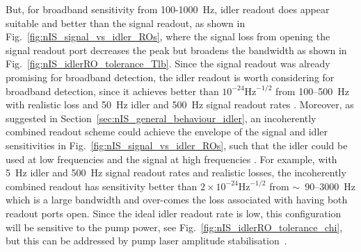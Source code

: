 But, for broadband sensitivity from 100-1000~Hz, idler readout does appear suitable and better than the signal readout, as shown in Fig.~\ref{fig:nIS_signal_vs_idler_ROs}, where the signal loss from opening the signal readout port decreases the peak but broadens the bandwidth as shown in Fig.~\ref{fig:nIS_idlerRO_tolerance_Tlb}. Since the signal readout was already promising for broadband detection, the idler readout is worth considering for broadband detection, since it achieves better than $10^{-24}\text{Hz}^{-1/2}$ from 100--500~Hz with realistic loss and 50~Hz idler and 500~Hz signal readout rates  .
Moreover, as suggested in Section~\ref{sec:nIS_general_behaviour_idler}, an incoherently combined readout scheme could achieve the envelope of the signal and idler sensitivities in Fig.~\ref{fig:nIS_signal_vs_idler_ROs}, such that the idler could be used at low frequencies and the signal at high frequencies . For example, with 5~Hz idler and 500~Hz signal readout rates and realistic losses, the incoherently combined readout has sensitivity better than $2\times10^{-24}\text{Hz}^{-1/2}$ from $\sim$~90--3000~Hz  which is a large bandwidth  and over-comes the loss associated with having both readout ports open.   Since the ideal idler readout rate is low, this configuration will be sensitive to the pump power, see Fig.~\ref{fig:nIS_idlerRO_tolerance_chi}, but this can be addressed by pump laser amplitude stabilisation~\cite{}. 

